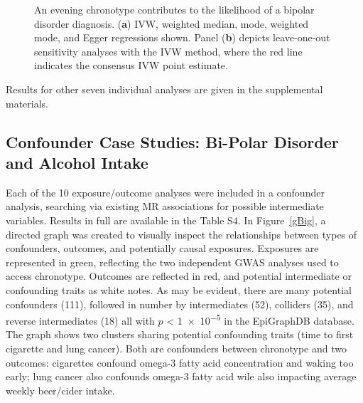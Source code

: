 \documentclass[genes,article,accept,moreauthors,pdftex]{Definitions/mdpi}
\begin{document}
\begin{figure}[H]
{\begin{subfigure}{.5\linewidth}
\caption{}
\label{bipolarrLoo}
\end{subfigure}}
\caption{An evening chronotype contributes to the likelihood of a bipolar disorder diagnosis. (\textbf{a}) IVW, weighted median, mode, weighted mode, and Egger regressions shown. Panel (\textbf{b}) depicts leave-one-out sensitivity analyses with the IVW method, where the red line indicates the consensus IVW point estimate.}
\label{bipolar}
\end{figure}

Results for other seven individual analyses are given in the supplemental materials.

\subsection{Confounder Case Studies: Bi-Polar Disorder and Alcohol Intake}
Each of the 10 exposure/outcome analyses were included in a confounder analysis, searching via existing MR associations for possible intermediate variables. Results in full are available in the {{Table S4}}. In Figure~\ref{gBig}, a directed graph was created to visually inspect the relationships between types of confounders, outcomes, and potentially causal exposures. Exposures are represented in green, reflecting the two independent GWAS analyses used to access chronotype. Outcomes are reflected in red, and potential intermediate or confounding traits as white notes. As may be evident, there are many potential confounders (111), followed in number by intermediates (52), colliders (35), and reverse intermediates (18) all with $p$ < \num{1e-5} in the EpiGraphDB database. The graph shows two clusters sharing potential confounding traits (time to first cigarette and lung cancer). Both are confounders between chronotype and two outcomes: cigarettes confound omega-3 fatty acid concentration and waking too early; lung cancer also confounds omega-3 fatty acid wile also impacting average weekly beer/cider intake.
\end{document}
